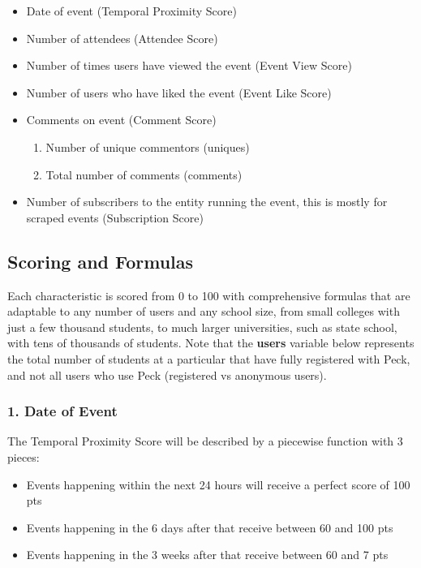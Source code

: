 \documentclass[12pt]{amsart}
\begin{document}
\begin{itemize}
	\item Date of event (Temporal Proximity Score)	
  	\item Number of attendees (Attendee Score)
 	\item Number of times users have viewed the event (Event View Score)
  	\item Number of users who have liked the event (Event Like Score)
	\item Comments on event (Comment Score)
	\begin{enumerate}
   		\item Number of unique commentors (uniques)
    		\item Total number of comments (comments)
  	\end{enumerate}
	\item Number of subscribers to the entity running the event, this is mostly for scraped events (Subscription Score)
\end{itemize}

\medskip

\subsection*{Scoring and Formulas}

Each characteristic is scored from 0 to 100 with comprehensive formulas that are adaptable to any number of users and any school size, from small colleges with just a few thousand students, to much larger universities, such as state school, with tens of thousands of students. Note that the \textbf{users} variable below represents the total number of students at a particular that have fully registered with Peck, and not all users who use Peck (registered vs anonymous users). \\

\subsubsection*{1. Date of Event}

The Temporal Proximity Score will be described by a piecewise function with 3 pieces:

\begin{itemize}
	\item Events happening within the next 24 hours will receive a perfect score of 100 pts
	\item Events happening in the 6 days after that receive between 60 and 100 pts
	\item Events happening in the 3 weeks after that receive between 60 and 7 pts
\end{itemize}
\end{document}
